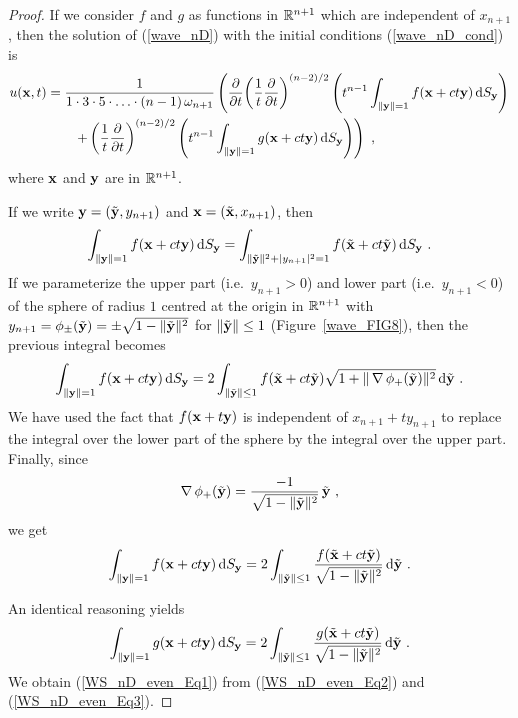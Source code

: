 \begin{proof}
If we consider $f$ and $g$ as functions in $\RR^{n+1}$ which are
independent of $x_{n+1}$, then the solution of (\ref{wave_nD}) with
the initial conditions (\ref{wave_nD_cond}) is 
\begin{equation} \label{WS_nD_even_Eq1}
\begin{split}
u(\VEC{x},t) &= \frac{1}{1\cdot 3 \cdot 5 \cdot \ldots \cdot (n-1)
\,\omega_{n+1}}
\left( \pdfdx{ \left( \frac{1}{t} \pdydx{}{t} \right)^{(n-2)/2} }{t}
\left( t^{n-1} \int_{\|\VEC{y}\|=1} f(\VEC{x} + ct \VEC{y})
\dss{S}{y} \right)  \right. \\
&\qquad \left. + \left( \frac{1}{t} \pdydx{}{t} \right)^{(n-2)/2}
\left( t^{n-1} \int_{\|\VEC{y}\|=1} g(\VEC{x}+ ct \VEC{y})
\dss{S}{y} \right) \right) \ ,
\end{split}
\end{equation}
where $\VEC{x}$ and $\VEC{y}$ are in $\RR^{n+1}$.

If we write $\VEC{y} = (\tilde{\VEC{y}}, y_{n+1})$ and
$\VEC{x} = (\tilde{\VEC{x}}, x_{n+1})$, then
\[
\int_{\|\VEC{y}\|=1} f(\VEC{x} + ct \VEC{y}) \dss{S}{y}
= \int_{\|\tilde{\VEC{y}}\|^2+|y_{n+1}|^2=1}
f(\tilde{\VEC{x}}+ ct \tilde{\VEC{y}}) \dss{S}{y} \ .
\]
If we parameterize the upper part (i.e.\ $y_{n+1}>0$) and lower part
(i.e.\ $y_{n+1}<0$) of the sphere of radius $1$ centred at the origin
in $\RR^{n+1}$ with $y_{n+1} = \phi_{\pm}(\tilde{\VEC{y}}) =
\pm \sqrt{1-\|\tilde{\VEC{y}}\|^2}$ for $\|\tilde{\VEC{y}}\|\leq 1$
(Figure~\ref{wave_FIG8}), then the previous integral becomes
\[
\int_{\|\VEC{y}\|=1} f(\VEC{x} + ct \VEC{y}) \dss{S}{y}
= 2\int_{\|\tilde{\VEC{y}}\|\leq 1}
f(\tilde{\VEC{x}} + ct \tilde{\VEC{y}})
\sqrt{1+\|\graD \phi_+(\tilde{\VEC{y}})\|^2} \dx{\tilde{\VEC{y}}} \ .
\]
We have used the fact that $f(\VEC{x}+t\VEC{y})$ is independent of
$x_{n+1}+ty_{n+1}$ to replace the integral over the lower part of the
sphere by the integral over the upper part.  Finally, since
\[
\graD \phi_+(\tilde{\VEC{y}}) =
\frac{-1}{\sqrt{1-\|\tilde{\VEC{y}}\|^2}}\,\tilde{\VEC{y}} \ ,
\]
we get
\begin{equation} \label{WS_nD_even_Eq2}
\int_{\|\VEC{y}\|=1} f(\VEC{x} + ct \VEC{y}) \dss{S}{y}
= 2\int_{\|\tilde{\VEC{y}}\|\leq 1}
\frac{ f(\tilde{\VEC{x}} + ct \tilde{\VEC{y}}) }
{\sqrt{1-\|\tilde{\VEC{y}}\|^2}} \dx{\tilde{\VEC{y}}} \ .
\end{equation}

An identical reasoning yields
\begin{equation} \label{WS_nD_even_Eq3}
\int_{\|\VEC{y}\|=1} g(\VEC{x} + ct \VEC{y}) \dss{S}{y}
= 2\int_{\|\tilde{\VEC{y}}\|\leq 1}
\frac{ g(\tilde{\VEC{x}} + ct \tilde{\VEC{y}}) }
{\sqrt{1-\|\tilde{\VEC{y}}\|^2}} \dx{\tilde{\VEC{y}}} \ .
\end{equation}
We obtain (\ref{WS_nD_even_Eq1}) from (\ref{WS_nD_even_Eq2}) and
(\ref{WS_nD_even_Eq3}).
\end{proof}

